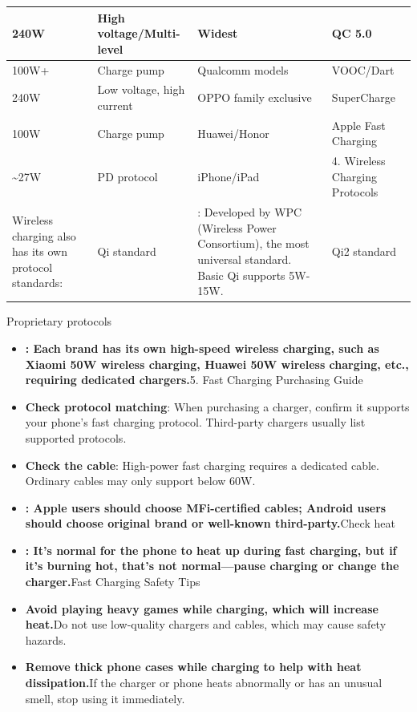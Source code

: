 
\begin{center}
\begin{tabularx}{\linewidth}{|X|X|X|X|}
\hline
\textbf{240W} & \textbf{High voltage/Multi-level} & \textbf{Widest} & \textbf{QC 5.0} \tabularnewline
\hline
100W+ & Charge pump & Qualcomm models & VOOC/Dart \tabularnewline
240W & Low voltage, high current & OPPO family exclusive & SuperCharge \tabularnewline
100W & Charge pump & Huawei/Honor & Apple Fast Charging \tabularnewline
\textasciitilde{}27W & PD protocol & iPhone/iPad & 4. Wireless Charging Protocols \tabularnewline
Wireless charging also has its own protocol standards: & Qi standard & : Developed by WPC (Wireless Power Consortium), the most universal standard. Basic Qi supports 5W-15W. & Qi2 standard \tabularnewline
\hline
\end{tabularx}
\end{center}


Proprietary protocols

\begin{itemize}
  \item \textbf{: Each brand has its own high-speed wireless charging, such as Xiaomi 50W wireless charging, Huawei 50W wireless charging, etc., requiring dedicated chargers.}5. Fast Charging Purchasing Guide
  \item \textbf{Check protocol matching}: When purchasing a charger, confirm it supports your phone's fast charging protocol. Third-party chargers usually list supported protocols.
  \item \textbf{Check the cable}: High-power fast charging requires a dedicated cable. Ordinary cables may only support below 60W.
\end{itemize}


\begin{itemize}
  \item \textbf{: Apple users should choose MFi-certified cables; Android users should choose original brand or well-known third-party.}Check heat
  \item \textbf{: It's normal for the phone to heat up during fast charging, but if it's burning hot, that's not normal—pause charging or change the charger.}Fast Charging Safety Tips
  \item \textbf{Avoid playing heavy games while charging, which will increase heat.}Do not use low-quality chargers and cables, which may cause safety hazards.
  \item \textbf{Remove thick phone cases while charging to help with heat dissipation.}If the charger or phone heats abnormally or has an unusual smell, stop using it immediately.
\end{itemize}

